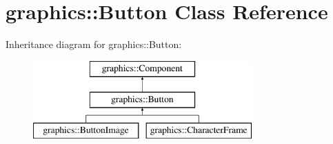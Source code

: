 \hypertarget{classgraphics_1_1_button}{\section{graphics\-:\-:Button Class Reference}
\label{classgraphics_1_1_button}
}
Inheritance diagram for graphics\-:\-:Button\-:\begin{figure}[H]
\begin{center}
\leavevmode
\includegraphics[height=3.000000cm]{classgraphics_1_1_button}
\end{center}
\end{figure}

